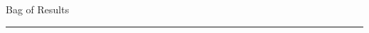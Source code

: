 \documentclass[journal,onecolumn,11pt,final]{IEEEtran}
\newcommand{\1}{\mathbb{1}}
\theoremstyle{plain}
\theoremstyle{definition}
\theoremstyle{plain}
\theoremstyle{plain}
\newtheorem{lemma}[theorem]{Lemma}
\theoremstyle{definition}
\newcommand{\ELnote}[1]{\textcolor{red}{[{\em {\bf **EL Note:} #1}]}}
\newcommand{\Qc}{\mathcal{Q}}
\begin{document}
\begin{center}
	{\LARGE Bag of Results}
\end{center}
\hrule height 1pt 

\vspace{10pt}
\noindent
%
%	
%
%	
%	
\end{document}
